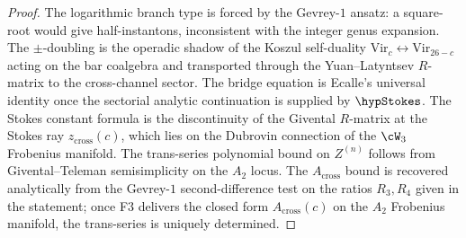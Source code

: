 \begin{proof}
The logarithmic branch type is forced by the Gevrey-$1$ ansatz: a
square-root would give half-instantons, inconsistent with the integer
genus expansion. The $\pm$-doubling is the operadic shadow of the
Koszul self-duality $\mathrm{Vir}_c \leftrightarrow \mathrm{Vir}_{26 - c}$
acting on the bar coalgebra and transported through the
Yuan--Latyntsev $R$-matrix to the cross-channel sector. The bridge
equation is Ecalle's universal identity \cite{Ecalle1981} once the
sectorial analytic continuation is supplied by $\hypStokes$. The
Stokes constant formula is the discontinuity of the Givental
$R$-matrix at the Stokes ray $z_{\mathrm{cross}}(c)$, which lies on
the Dubrovin connection of the $\cW_3$ Frobenius manifold. The
trans-series polynomial bound on $Z^{(n)}$ follows from
Givental--Teleman semisimplicity on the $A_2$ locus. The $A_{\mathrm{cross}}$
bound is recovered analytically from the Gevrey-$1$ second-difference
test on the ratios $R_3, R_4$ given in the statement; once F3
delivers the closed form $A_{\mathrm{cross}}(c)$ on the $A_2$
Frobenius manifold, the trans-series is uniquely determined.
\end{proof}
